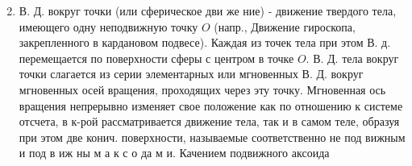\documentclass[10pt]{article}
\begin{document}
\begin{enumerate}

  \setcounter{enumi}{1}

  \item В. Д. вокруг точки (или сферическое дви же ние) - движение твердого тела, имеющего одну неподвижную точку $O$ (напр., Движение гироскопа, закрепленного в кардановом подвесе). Каждая из точек тела при этом В. д. перемещается по поверхности сферы с центром в точке $O$. В. Д. тела вокруг точки слагается из серии элементарных или мгновенных В. Д. вокруг мгновенных осей вращения, проходящих через эту точку. Мгновенная ось вращения непрерывно изменяет свое положение как по отношению к системе отсчета, в к-рой рассматривается движение тела, так и в самом теле, образуя при этом две конич. поверхности, называемые соответственно не под вижным и под в иж ны м а к с о да м и. Качением подвижного аксоида

\end{enumerate}
\end{document}
